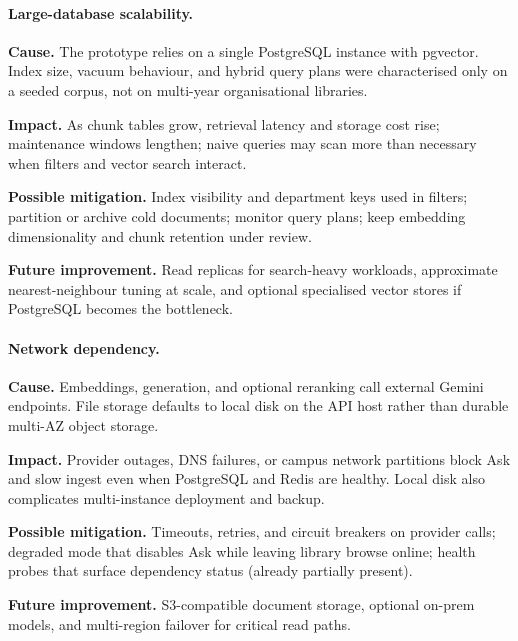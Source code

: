 \paragraph{Large-database scalability.}
\noindent\textbf{Cause.} The prototype relies on a single PostgreSQL instance with
pgvector. Index size, vacuum behaviour, and hybrid query plans were characterised
only on a seeded corpus, not on multi-year organisational libraries.\par\vspace{0.15em}
\noindent\textbf{Impact.} As chunk tables grow, retrieval latency and storage
cost rise; maintenance windows lengthen; naive queries may scan more than
necessary when filters and vector search interact.\par\vspace{0.15em}
\noindent\textbf{Possible mitigation.} Index visibility and department keys used
in filters; partition or archive cold documents; monitor query plans; keep
embedding dimensionality and chunk retention under review.\par\vspace{0.15em}
\noindent\textbf{Future improvement.} Read replicas for search-heavy workloads,
approximate nearest-neighbour tuning at scale, and optional specialised vector
stores if PostgreSQL becomes the bottleneck.
\par\vspace{0.35em}
\paragraph{Network dependency.}
\noindent\textbf{Cause.} Embeddings, generation, and optional reranking call
external Gemini endpoints. File storage defaults to local disk on the API host
rather than durable multi-AZ object storage.\par\vspace{0.15em}
\noindent\textbf{Impact.} Provider outages, DNS failures, or campus network
partitions block Ask and slow ingest even when PostgreSQL and Redis are healthy.
Local disk also complicates multi-instance deployment and backup.\par\vspace{0.15em}
\noindent\textbf{Possible mitigation.} Timeouts, retries, and circuit breakers on
provider calls; degraded mode that disables Ask while leaving library browse
online; health probes that surface dependency status (already partially present).\par\vspace{0.15em}
\noindent\textbf{Future improvement.} S3-compatible document storage, optional
on-prem models, and multi-region failover for critical read paths.
\par\vspace{0.35em}
